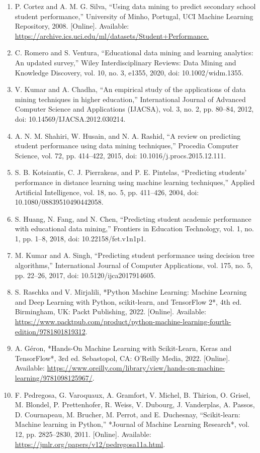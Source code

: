 \documentclass[
]{article}
\begin{document}
\begin{enumerate}
\def\labelenumi{\arabic{enumi}.}
\item
  P. Cortez and A. M. G. Silva, ``Using data mining to predict secondary
  school student performance,'' University of Minho, Portugal, UCI
  Machine Learning Repository, 2008. {[}Online{]}. Available:
  \url{https://archive.ics.uci.edu/ml/datasets/Student+Performance.}
\item
  C. Romero and S. Ventura, ``Educational data mining and learning
  analytics: An updated survey,'' Wiley Interdisciplinary Reviews: Data
  Mining and Knowledge Discovery, vol. 10, no. 3, e1355, 2020, doi:
  10.1002/widm.1355.
\item
  V. Kumar and A. Chadha, ``An empirical study of the applications of
  data mining techniques in higher education,'' International Journal of
  Advanced Computer Science and Applications (IJACSA), vol. 3, no. 2,
  pp. 80--84, 2012, doi: 10.14569/IJACSA.2012.030214.
\item
  A. N. M. Shahiri, W. Husain, and N. A. Rashid, ``A review on
  predicting student performance using data mining techniques,''
  Procedia Computer Science, vol. 72, pp. 414--422, 2015, doi:
  10.1016/j.procs.2015.12.111.
\item
  S. B. Kotsiantis, C. J. Pierrakeas, and P. E. Pintelas, ``Predicting
  students' performance in distance learning using machine learning
  techniques,'' Applied Artificial Intelligence, vol. 18, no. 5, pp.
  411--426, 2004, doi: 10.1080/08839510490442058.
\item
  S. Huang, N. Fang, and N. Chen, ``Predicting student academic
  performance with educational data mining,'' Frontiers in Education
  Technology, vol. 1, no. 1, pp. 1--8, 2018, doi: 10.22158/fet.v1n1p1.
\item
  M. Kumar and A. Singh, ``Predicting student performance using decision
  tree algorithms,'' International Journal of Computer Applications,
  vol. 175, no. 5, pp. 22--26, 2017, doi: 10.5120/ijca2017914605.
\item
  S. Raschka and V. Mirjalili, *Python Machine Learning: Machine
  Learning and Deep Learning with Python, scikit-learn, and TensorFlow
  2*, 4th ed. Birmingham, UK: Packt Publishing, 2022. {[}Online{]}.
  Available:
  \url{https://www.packtpub.com/product/python-machine-learning-fourth-edition/9781801819312}.
\item
  A. Géron, *Hands-On Machine Learning with Scikit-Learn, Keras and
  TensorFlow*, 3rd ed. Sebastopol, CA: O'Reilly Media, 2022.
  {[}Online{]}. Available:
  \url{https://www.oreilly.com/library/view/hands-on-machine-learning/9781098125967/}.
\item
  F. Pedregosa, G. Varoquaux, A. Gramfort, V. Michel, B. Thirion, O.
  Grisel, M. Blondel, P. Prettenhofer, R. Weiss, V. Dubourg, J.
  Vanderplas, A. Passos, D. Cournapeau, M. Brucher, M. Perrot, and E.
  Duchesnay, ``Scikit-learn: Machine learning in Python,'' *Journal of
  Machine Learning Research*, vol. 12, pp. 2825--2830, 2011.
  {[}Online{]}. Available:
  \url{https://jmlr.org/papers/v12/pedregosa11a.html}.
\end{enumerate}
\end{document}
